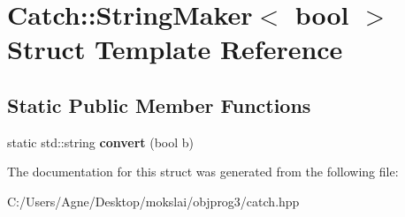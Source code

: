 \hypertarget{struct_catch_1_1_string_maker_3_01bool_01_4}{}\section{Catch\+:\+:String\+Maker$<$ bool $>$ Struct Template Reference}
\label{struct_catch_1_1_string_maker_3_01bool_01_4}
\subsection*{Static Public Member Functions}
\begin{DoxyCompactItemize}
\item 
\mbox{\label{struct_catch_1_1_string_maker_3_01bool_01_4_a37e9899c82c4b4515f876f16f8957a77}} 
static std\+::string {\bfseries convert} (bool b)
\end{DoxyCompactItemize}


The documentation for this struct was generated from the following file\+:\begin{DoxyCompactItemize}
\item 
C\+:/\+Users/\+Agne/\+Desktop/mokslai/objprog3/catch.\+hpp\end{DoxyCompactItemize}
